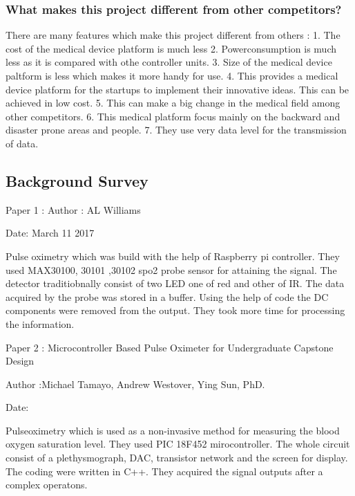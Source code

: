 
\subsubsection{What makes this project different from other competitors?}

There are many features which make this project different from others :
1. The cost of the medical device platform is much less
2. Powerconsumption is much less as it is compared with othe controller units.
3. Size of the medical device paltform is less which makes it more handy for use.
4. This provides a medical device platform for the startups to implement their innovative ideas. This can be achieved in low cost.
5. This can make a big change in the medical field among other competitors.
6. This medical platform focus mainly on the backward and disaster prone areas and people.
7. They use very data level for the transmission of data.   


\subsection{Background Survey}

Paper 1 : 
Author  : AL Williams  

Date: March 11 2017 
 
Pulse oximetry which was build with the help of Raspberry pi controller. 
They used MAX30100, 30101 ,30102  spo2 probe sensor for attaining the signal. 
The detector traditiobnally consist of two LED one of red and other of IR. 
The data acquired by the probe was stored in a buffer. 
Using the help of code the DC components were removed from the output. 
They took more time for processing the information. 

Paper 2 :  Microcontroller Based Pulse Oximeter for Undergraduate Capstone Design \cite{tamayo2010microcontroller}

Author  :Michael Tamayo, Andrew Westover, Ying Sun, PhD.

Date: 

Pulseoximetry which is used as a non-invasive method for measuring the blood oxygen saturation level. 
They used PIC 18F452  mirocontroller. The whole circuit consist of a plethysmograph, DAC, transistor network and the screen for display. 
The coding were written in C++.
They acquired the signal outputs after a complex operatons.  

